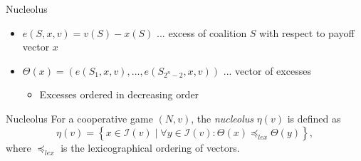 \documentclass{beamer}
\begin{document}
\begin{frame}{Nucleolus}
    \pause

    \begin{itemize}
        \item $e(S,x,v) = v(S) - x(S)$ ... excess of coalition $S$ with respect to payoff vector $x$
        \pause
        \item $\Theta(x)=\left(e(S_1,x,v), \dots, e(S_{2^{n}-2},x,v)\right)$ ... vector of excesses
        \begin{itemize}
            \item Excesses ordered in decreasing order
        \end{itemize}
    \end{itemize}

    \pause

    \begin{block}{Nucleolus}
        \pause
        For a cooperative game $(N,v)$, the \emph{nucleolus} $\eta(v)$ is defined as
        \begin{displaymath}
            \eta(v) = \left\{ x \in \mathcal{I}(v) \mid \forall y \in \mathcal{I}(v): \Theta(x) \preceq_{lex} \Theta(y)\right\},
        \end{displaymath}
        where $\preceq_{lex}$ is the lexicographical ordering of vectors.
    \end{block}
\end{frame}


\end{document}
